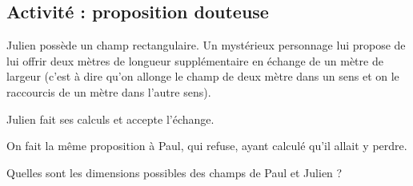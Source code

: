 
\subsection*{Activité : proposition douteuse}

Julien possède un champ rectangulaire. Un mystérieux personnage lui propose de lui offrir deux mètres de longueur supplémentaire en échange de un mètre de largeur (c'est à dire qu'on allonge le champ de deux mètre dans un sens et on le raccourcis de un mètre dans l'autre sens).

Julien fait ses calculs et accepte l'échange.

On fait la même proposition à Paul, qui refuse, ayant calculé qu'il allait y perdre.

Quelles sont les dimensions possibles des champs de Paul et Julien ?

